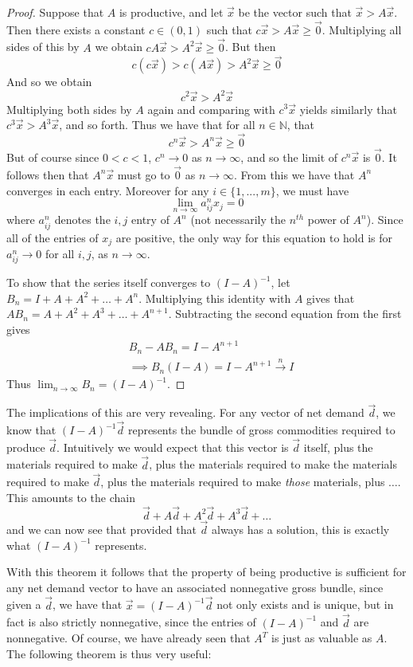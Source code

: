\begin{proof}
	Suppose that $A$ is productive, and let $\vec{x}$ be the vector such that $\vec{x} > A\vec{x}$. Then there exists a constant $c \in (0,1)$ such that $c\vec{x} > A\vec{x} \geq \vec{0}$. Multiplying all sides of this by $A$ we obtain $cA\vec{x} > A^2\vec{x} \geq \vec{0}$. But then 
\[ c(c\vec{x}) > c(A\vec{x}) > A^2\vec{x} \geq \vec{0} \]
And so we obtain
\[ c^2\vec{x} > A^2\vec{x} \]
Multiplying both sides by $A$ again and comparing with $c^3\vec{x}$ yields similarly that $c^3\vec{x} > A^3\vec{x}$, and so forth. Thus we have that for all $n \in \mathbb{N}$, that 
\[ c^n \vec{x} > A^n\vec{x} \geq \vec{0} \] 
But of course since $0 < c < 1$, $c^n \to 0$ as $n \to \infty$, and so the limit of $c^n\vec{x}$ is $\vec{0}$. It follows then that $A^n\vec{x}$ must go to $\vec{0}$ as $n \to \infty$. From this we have that $A^n$ converges in each entry. Moreover for any $i \in \{1,...,m\}$, we must have
\[ \lim_{n\to\infty} a^n_{ij}x_j = 0 \]
where $a^n_{ij}$ denotes the $i,j$ entry of $A^n$ (not necessarily the $n^{th}$ power of $A^n$). Since all of the entries of $x_j$ are positive, the only way for this equation to hold is for $a^n_{ij} \to 0$ for all $i,j$, as $n \to \infty$. \par 
To show that the series itself converges to $(I-A)^{-1}$, let $B_n = I+A+A^2+\ldots + A^n$. Multiplying this identity with $A$ gives that $AB_n = A+A^2+A^3 + \ldots + A^{n+1}$. Subtracting the second equation from the first gives
\begin{align*}
	& B_n - AB_n = I-A^{n+1} \\
	&\implies B_n(I-A) = I-A^{n+1} \overset{n}\to I
\end{align*}
Thus $\lim_{n\to\infty}B_n = (I-A)^{-1}$. 
\end{proof}
The implications of this are very revealing. For any vector of net demand $\vec{d}$, we know that $(I-A)^{-1}\vec{d}$ represents the bundle of gross commodities required to produce $\vec{d}$. Intuitively we would expect that this vector is $\vec{d}$ itself, plus the materials required to make $\vec{d}$, plus the materials required to make the materials required to make $\vec{d}$, plus the materials required to make \emph{those} materials, plus $\ldots$. This amounts to the chain 
\[ \vec{d} + A\vec{d} + A^2\vec{d} + A^3\vec{d} + \ldots \]
and we can now see that provided that $\vec{d}$ always has a solution, this is exactly what $(I-A)^{-1}$ represents.  \par 
With this theorem it follows that the property of being productive is sufficient for any net demand vector to have an associated nonnegative gross bundle, since given a $\vec{d}$, we have that $\vec{x} = (I-A)^{-1}\vec{d}$ not only exists and is unique, but in fact is also strictly nonnegative, since the entries of $(I-A)^{-1}$ and $\vec{d}$ are nonnegative. Of course, we have already seen that $A^T$ is just as valuable as $A$. The following theorem is thus very useful:

